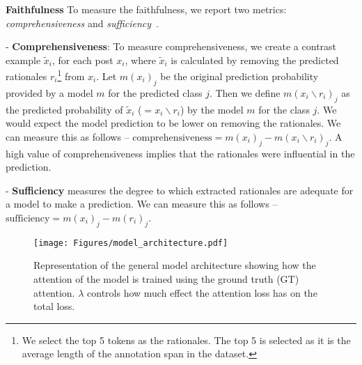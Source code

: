\documentclass[letterpaper]{article} \usepackage{aaai21}  \usepackage{times}  \usepackage{helvet} \usepackage{courier}  \usepackage[hyphens]{url}  \usepackage{graphicx} \urlstyle{rm} \def\UrlFont{\rm}  \usepackage{natbib}  \usepackage{caption}
\begin{document}
\noindent\textbf{Faithfulness}
To measure the faithfulness, we report two metrics: \textit{comprehensiveness} and \textit{sufficiency}~\cite{deyoung2019eraser}.
\begin{compactitem}
    \item[-]  \textbf{Comprehensiveness}: To measure comprehensiveness, we create a contrast example $\tilde{x}_i$, for each post $x_i$,
    where $\tilde{x}_i$ is calculated by removing the predicted rationales $r_i$\footnote{We select the top 5 tokens as the rationales. The top 5 is selected as it is the average length of the annotation span in the dataset.} from $x_i$. Let $m(x_i)_j$ be the original prediction probability provided by a model $m$ for the predicted class $j$. Then we define $m(x_i \backslash r_i)_j$ as the predicted probability of $\tilde{x}_i$ ($=x_i \backslash r_i$) by the   model $m$ for the  class $j$.
    We would expect the model prediction to be lower on removing the rationales. We can measure this as follows -- ${\text{comprehensiveness}} = m(x_i)_j - m(x_i \backslash r_i)_j$.
    A high value of comprehensiveness implies that the rationales were influential in the prediction.
    
    \item[-] \textbf{Sufficiency} measures the degree to which extracted rationales are adequate for a model to make a prediction. We can measure this as follows -- ${\text{sufficiency}} = m(x_i)_j - m(r_i)_j$.
\end{compactitem}


\begin{figure}[!th]
    \centering
    \texttt{[image: Figures/model\_architecture.pdf]}
    \caption{Representation of the general model architecture showing how the attention of the model is trained using the ground truth (GT) attention. $\lambda$ controls how much effect the attention loss has on the total loss.}
    \label{fig:model_archi}
\end{figure}
\end{document}
